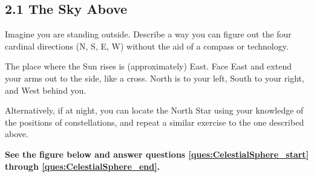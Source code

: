 \documentclass[addpoints]{exam}
\begin{document}
\begin{questions}

\section*{2.1 The Sky Above}

\question
Imagine you are standing outside. Describe a way you can figure out the four cardinal directions (N, S, E, W) without the aid of a compass or technology.

\begin{solution}
    The place where the Sun rises is (approximately) East. Face East and extend your arms out to the side, like a cross. North is to your left, South to your right, and West behind you.

    Alternatively, if at night, you can locate the North Star using your knowledge of the positions of constellations, and repeat a similar exercise to the one described above.
\end{solution}

\begin{EnvUplevel}
\textbf{See the figure below and answer questions \ref{ques:CelestialSphere_start} through \ref{ques:CelestialSphere_end}.}
\end{EnvUplevel}

\begin{figure}[h!]
    \centering
{}
\end{figure}
\end{questions}
\end{document}
